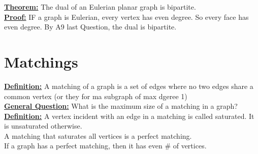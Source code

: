 \documentclass[12pt]{article}
\newcommand{\myt}[1]{\textbf{\underline{#1}}}
\begin{document}
	\myt{Theorem:} The dual of an Eulerian planar graph is bipartite.\\
	
	\myt{Proof:} IF a graph is Eulerian, every vertex has even degree. So every face has even degree. By A9 last Question, the dual is bipartite.\\
	
	\section*{Matchings}
	\myt{Definition:} A matching of a graph is a  set of edges where no two edges share a common vertex (or they for ma subgraph of max dgeree 1)\\
	
	\myt{General Question:} What is the maximum size of a matching in a graph?\\
	
	\myt{Definition:} A vertex incident with an edge in a matching is called saturated. It is unsaturated otherwise.\\
	
	A matching that saturates all vertices is a perfect matching.\\
	
	If a graph has a perfect matching, then it has even \# of vertices.\\
	
\end{document}
